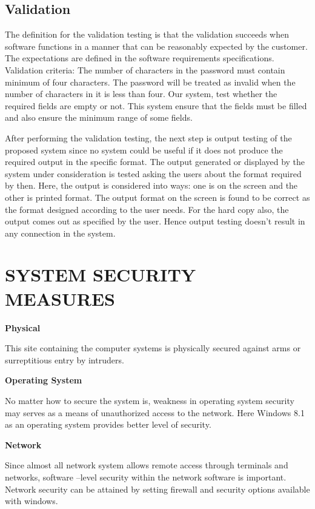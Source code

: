 \section{Validation}

The definition for the validation testing is that the validation succeeds when software functions in a manner that can be reasonably expected by the customer. The expectations are defined in the software requirements specifications. Validation criteria: The number of characters in the password must contain minimum of four characters. The password will be treated as invalid when the number of characters in it is less than four. Our system, test whether the required fields are empty or not. This system ensure that the fields must be filled and also ensure the minimum range of some fields.

After performing the validation testing, the next step is output testing of the proposed system since no system could be useful if it does not produce the required output in the specific format. The output generated or displayed by the system under consideration is tested asking the users about the format required by then. Here, the output is considered into ways: one is on the screen and the other is printed format. The output format on the screen is found to be correct as the format designed according to the user needs. For the hard copy also, the output comes out as specified by the user. Hence output testing doesn’t result in any connection in the system.
%
%
%
\chapter{SYSTEM SECURITY MEASURES}

{\bf Physical }

This site containing the computer systems is physically secured against arms or surreptitious entry by intruders. 

{\bf Operating System }

No matter how to secure the system is, weakness in operating system security may serves as a means of unauthorized access to the network. Here Windows 8.1 as an operating system provides better level of security.  

{\bf Network }

Since almost all network system allows remote access through terminals and networks, software –level security within the network software is important. Network security can be attained by setting firewall and security options available with windows.  

